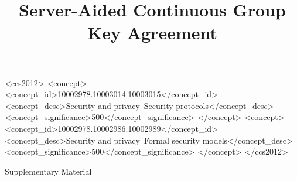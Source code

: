 \documentclass[sigconf, anonymous]{acmart}
\begin{document}
\title{Server-Aided Continuous Group Key Agreement}

\begin{abstract}

\end{abstract}

\begin{CCSXML}
<ccs2012>
   <concept>
       <concept_id>10002978.10003014.10003015</concept_id>
       <concept_desc>Security and privacy~Security protocols</concept_desc>
       <concept_significance>500</concept_significance>
       </concept>
   <concept>
       <concept_id>10002978.10002986.10002989</concept_id>
       <concept_desc>Security and privacy~Formal security models</concept_desc>
       <concept_significance>500</concept_significance>
       </concept>
 </ccs2012>
\end{CCSXML}



\maketitle




% 
% 






%




\clearpage
\newpage
\appendix

\begin{center}\Huge
	Supplementary Material
\end{center}





% 





\end{document}

